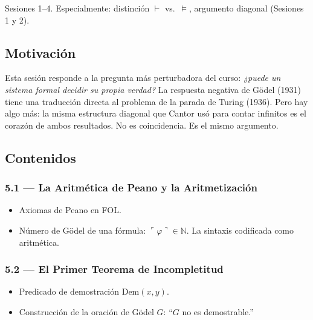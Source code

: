 \documentclass[11pt, letterpaper]{article}
\begin{document}
\begin{prereqs}
Sesiones 1--4. Especialmente: distinci\'on $\vdash$ vs.\ $\models$, argumento diagonal (Sesiones 1 y 2).
\end{prereqs}

\subsection*{Motivaci\'on}
Esta sesi\'on responde a la pregunta m\'as perturbadora del curso: \emph{¿puede un sistema formal decidir su propia verdad?} La respuesta negativa de G\"odel (1931) tiene una traducci\'on directa al problema de la parada de Turing (1936). Pero hay algo m\'as: la misma estructura diagonal que Cantor us\'o para contar infinitos es el coraz\'on de ambos resultados. No es coincidencia. Es el mismo argumento.

\subsection{Contenidos}

\subsubsection{5.1 --- La Aritm\'etica de Peano y la Aritmetizaci\'on}
\begin{itemize}
  \item Axiomas de Peano en FOL.
  \item N\'umero de G\"odel de una f\'ormula: $\ulcorner\varphi\urcorner\in\mathbb{N}$. La sintaxis codificada como aritm\'etica.
\end{itemize}

\subsubsection{5.2 --- El Primer Teorema de Incompletitud}
\begin{itemize}
  \item Predicado de demostraci\'on $\text{Dem}(x,y)$.
  \item Construcci\'on de la oraci\'on de G\"odel $G$: ``$G$ no es demostrable.''
\end{itemize}
\end{document}
